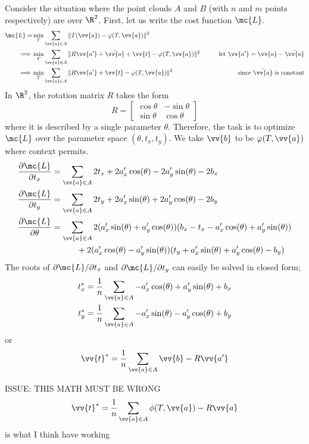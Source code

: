 \documentclass[12pt]{article}
\theoremstyle{defstyle}
\begin{document}
Consider the situation where the point clouds $A$ and $B$ (with $n$ and $m$ points respectively) are over $\R^2$.
First, let us write the cost function $\mc{L}$.
\begin{alignat*}{2}
    \mc{L} = & \min\limits_{\substack{T}} \sum_{\vv{a} \in A} \| T(\vv{a}) - \varphi(T, \vv{a}) \|^2                                                                              \\
    \implies & \min\limits_{\substack{T}} \sum_{\vv{a} \in A} \| R\vv{a'} + \bar{\vv{a}} + \vv{t} - \varphi(T, \vv{a}) \|^2 & \qquad \text{let $\vv{a'} = \vv{a} - \bar{\vv{a}}$} \\
    \implies & \min\limits_{\substack{T}} \sum_{\vv{a} \in A} \| R\vv{a'} + \vv{t} - \varphi(T, \vv{a}) \|^2                & \qquad \text{since $\bar{\vv{a}}$ is constant}
\end{alignat*}
In $\R^2$, the rotation matrix $R$ takes the form
\[
    R = \begin{bmatrix}
        \cos \theta & -\sin \theta \\
        \sin \theta & \cos \theta
    \end{bmatrix}
\]
where it is described by a single parameter $\theta$.
Therefore, the task is to optimize $\mc{L}$ over the parameter space $(\theta, t_x, t_y)$.
We take $\vv{b}$ to be $\varphi(T, \vv{a})$ where context permits.
\begin{align*}
    \frac{\partial \mc{L}}{\partial t_x}    & = \sum_{\vv{a} \in A} 2t_x + 2a'_x\cos(\theta) - 2a'_y\sin(\theta) -2b_x                                      \\
    \frac{\partial \mc{L}}{\partial t_y}    & = \sum_{\vv{a} \in A} 2t_y + 2a'_x\sin(\theta) + 2a'_y\cos(\theta) -2b_y                                      \\
    \frac{\partial \mc{L}}{\partial \theta} & = \sum_{\vv{a} \in A} 2(a'_x\sin(\theta) + a'_y\cos(\theta))(b_x - t_x - a'_x\cos(\theta) + a'_y\sin(\theta)) \\
                                            & \quad \quad \quad + 2(a'_x\cos(\theta) - a'_y \sin(\theta))(t_y + a'_x\sin(\theta) + a'_y\cos(\theta) - b_y)
\end{align*}
The roots of $\partial \mc{L}/\partial t_x$ and $\partial \mc{L}/\partial t_y$ can easily be solved in closed form;
\begin{gather*}
    t_x^* = \frac{1}{n} \sum_{\vv{a} \in A} -a'_x\cos(\theta) + a'_y\sin(\theta) + b_x \\
    t_y^* = \frac{1}{n} \sum_{\vv{a} \in A} -a'_x\sin(\theta) - a'_y\cos(\theta) + b_y
\end{gather*}
or
\[
    \vv{t}^* = \frac{1}{n} \sum_{\vv{a} \in A} \vv{b} - R \vv{a'}
\]

ISSUE: THIS MATH MUST BE WRONG
\[
    \vv{t}^* = \frac{1}{n} \sum_{\vv{a} \in A} \phi(T, \vv{a}) - R \vv{a}
\]
is what I think have working
\end{document}
